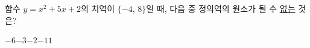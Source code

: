 함수 $y=x^2+5x+2$의 치역이 $\{-4,\,8\}$일 때, 다음 중 정의역의 원소가 될 수 \underline{없는} 것은?
\begin{choices32}{$-6$}{$-3$}{$-2$}{$-1$}{$1$}\end{choices32}
